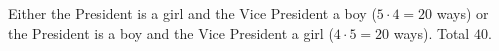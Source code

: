Either the President is a girl and the Vice President a boy ($5\cdot4=20$ ways) or the President is a boy and the Vice President a girl ($4\cdot5=20$ ways). Total $\boxed{40}$.
